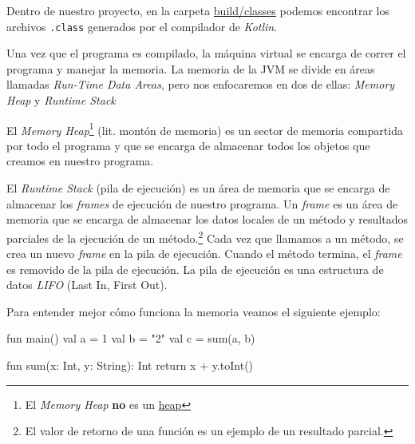   \begin{note}
    Dentro de nuestro proyecto, en la carpeta \url{build/classes} podemos encontrar los archivos
    \texttt{.class} generados por el compilador de \textit{Kotlin}.
  \end{note}

  Una vez que el programa es compilado, la máquina virtual se encarga de correr el programa y 
  manejar la memoria.
  La memoria de la JVM se divide en áreas llamadas \textit{Run-Time Data Areas}, pero nos 
  enfocaremos en dos de ellas: \textit{Memory Heap} y \textit{Runtime Stack}

  \begin{defaultbox}
    El \textit{Memory Heap}\footnote{
      El \textit{Memory Heap} \textbf{no} es un 
      \href{https://en.wikipedia.org/wiki/Heap_(data_structure)}{heap}
    } (lit. montón de memoria) es un sector de memoria compartida por todo el programa y que se 
    encarga de almacenar todos los objetos que creamos en nuestro programa.
  \end{defaultbox}

  \begin{defaultbox}
    El \textit{Runtime Stack} (pila de ejecución) es un área de memoria que se encarga de almacenar
    los \textit{frames} de ejecución de nuestro programa.
    Un \textit{frame} es un área de memoria que se encarga de almacenar los datos locales de un
    método y resultados parciales de la ejecución de un método.\footnote{
      El valor de retorno de una función es un ejemplo de un resultado parcial.
    }
    Cada vez que llamamos a un método, se crea un nuevo \textit{frame} en la pila de ejecución.
    Cuando el método termina, el \textit{frame} es removido de la pila de ejecución.
    La pila de ejecución es una estructura de datos \textit{LIFO} (Last In, First Out).
  \end{defaultbox}

  Para entender mejor cómo funciona la memoria veamos el siguiente ejemplo:

  \begin{kotlin}
    fun main() {
      val a = 1
      val b = "2"
      val c = sum(a, b)
    }

    fun sum(x: Int, y: String): Int {
      return x + y.toInt()
    }
  \end{kotlin}

